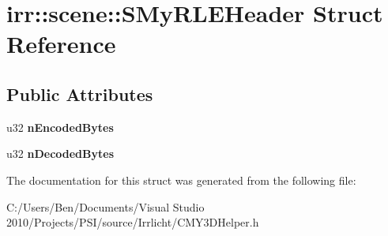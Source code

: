 \hypertarget{structirr_1_1scene_1_1_s_my_r_l_e_header}{\section{irr\-:\-:scene\-:\-:S\-My\-R\-L\-E\-Header Struct Reference}
\label{structirr_1_1scene_1_1_s_my_r_l_e_header}
}
\subsection*{Public Attributes}
\begin{DoxyCompactItemize}
\item 
\hypertarget{structirr_1_1scene_1_1_s_my_r_l_e_header_a719feb62c3ce3327dbf5c2ddb63ab69a}{u32 {\bfseries n\-Encoded\-Bytes}}\label{structirr_1_1scene_1_1_s_my_r_l_e_header_a719feb62c3ce3327dbf5c2ddb63ab69a}

\item 
\hypertarget{structirr_1_1scene_1_1_s_my_r_l_e_header_ae65d1a44b4d7ed2bc8b9ce6951a7c841}{u32 {\bfseries n\-Decoded\-Bytes}}\label{structirr_1_1scene_1_1_s_my_r_l_e_header_ae65d1a44b4d7ed2bc8b9ce6951a7c841}

\end{DoxyCompactItemize}


The documentation for this struct was generated from the following file\-:\begin{DoxyCompactItemize}
\item 
C\-:/\-Users/\-Ben/\-Documents/\-Visual Studio 2010/\-Projects/\-P\-S\-I/source/\-Irrlicht/C\-M\-Y3\-D\-Helper.\-h\end{DoxyCompactItemize}
